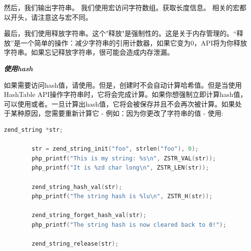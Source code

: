 
然后，我们输出字符串。 我们使用宏访问字符数组。获取长度信息。 相关的宏都以开头，请注意这与宏不同。


最后，我们使用释放字符串。这个"释放"是强制性的。这是关于内存管理的。“释放”是一个简单的操作：减少字符串的引用计数器，如果它变为0，API将为你释放字符串。如果忘记释放字符串，很可能会造成内存泄漏。


\textbf{\textit{使用hash}}

如果需要访问hash值，请使用。但是，创建时不会自动计算哈希值。但是当使用HashTable API操作字符串时，它将会完成计算。如果你想强制立即计算hash值，可以使用或者。一旦计算出hash值，它将会被保存并且不会再次被计算。如果处于某种原因，您需要重新计算它 - 例如：因为你更改了字符串的值 - 使用:



\begin{lstlisting}[language=c]
        zend_string *str;

        str = zend_string_init("foo", strlen("foo"), 0);
        php_printf("This is my string: %s\n", ZSTR_VAL(str));
        php_printf("It is %zd char long\n", ZSTR_LEN(str));
        
        zend_string_hash_val(str);
        php_printf("The string hash is %lu\n", ZSTR_H(str));
        
        zend_string_forget_hash_val(str);
        php_printf("The string hash is now cleared back to 0!");
        
        zend_string_release(str);
\end{lstlisting}


